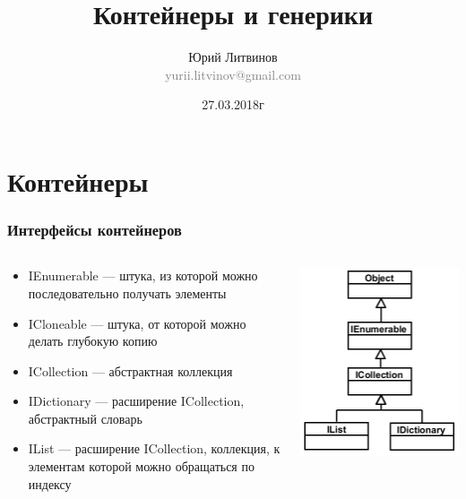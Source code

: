 \documentclass[xetex,mathserif,serif]{beamer}
\title{Контейнеры и генерики}
\author[Юрий Литвинов]{Юрий Литвинов\\\small{\textcolor{gray}{yurii.litvinov@gmail.com}}}
\date{27.03.2018г}
\begin{document}
	\frame{\titlepage}

	\section{Контейнеры}

	\begin{frame}
		\frametitle{Интерфейсы контейнеров}
		\begin{columns}
			\begin{column}{0.65\textwidth}
				\begin{itemize}
					\item IEnumerable --- штука, из которой можно последовательно получать элементы
					\item ICloneable --- штука, от которой можно делать глубокую копию
					\item ICollection --- абстрактная коллекция
					\item IDictionary --- расширение ICollection, абстрактный словарь
					\item IList --- расширение ICollection, коллекция, к элементам которой можно обращаться по индексу
				\end{itemize}
			\end{column}
			\begin{column}{0.3\textwidth}
				\includegraphics[width=\textwidth]{interfaces.png}
			\end{column}
		\end{columns}
	\end{frame}
\end{document}
